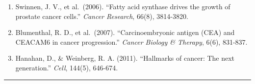 \documentclass[
]{article}
\providecommand{\tightlist}{%
  \setlength{\itemsep}{0pt}\setlength{\parskip}{0pt}}
\begin{document}
\begin{enumerate}
\def\labelenumi{\arabic{enumi}.}
\tightlist
\item
  Swinnen, J. V., et al.~(2006). ``Fatty acid synthase drives the growth
  of prostate cancer cells.'' \emph{Cancer Research}, 66(8), 3814-3820.
\item
  Blumenthal, R. D., et al.~(2007). ``Carcinoembryonic antigen (CEA) and
  CEACAM6 in cancer progression.'' \emph{Cancer Biology \& Therapy},
  6(6), 831-837.
\item
  Hanahan, D., \& Weinberg, R. A. (2011). ``Hallmarks of cancer: The
  next generation.'' \emph{Cell}, 144(5), 646-674.
\end{enumerate}

\begin{center}\rule{0.5\linewidth}{0.5pt}\end{center}
\end{document}
